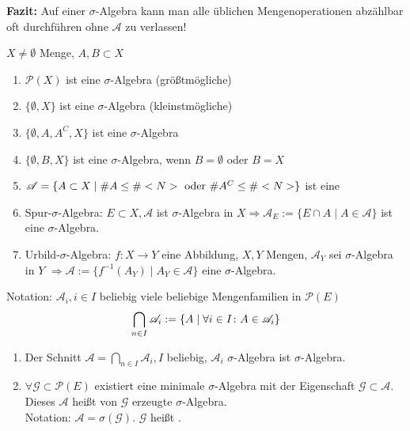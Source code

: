\textbf{Fazit:} Auf einer $\sigma$-Algebra kann man alle üblichen Mengenoperationen abzählbar oft durchführen ohne $\mathscr{A}$ zu verlassen!

\begin{example}
	$X\neq\emptyset$ Menge, $A,B\subset X$
	\begin{enumerate}[label=(\alph*)]
		\item $\mathscr{P}(X)$ ist eine $\sigma$-Algebra (größtmögliche)
		\item $\{\emptyset,X\}$ ist eine $\sigma$-Algebra (kleinstmögliche)
		\item $\{\emptyset,A,A^C,X\}$ ist eine $\sigma$-Algebra
		\item $\{\emptyset,B,X\}$ ist eine $\sigma$-Algebra, wenn $B=\emptyset$ oder $B=X$
		\item $\mathscr{A}=\{A\subset X\mid \#A\le \#<N>\text{ oder } \#A^C\le \#<N>\}$ ist eine \sigmalg %
		\item Spur-$\sigma$-Algebra: $E \subset X,\mathscr{A}$ ist $\sigma$-Algebra in $X \Rightarrow \mathscr{A}_E := \{E \cap A \mid A \in \mathscr{A}\}$ ist eine $\sigma$-Algebra.
		\item Urbild-$\sigma$-Algebra: $f: X \to Y$ eine Abbildung, $X,Y$ Mengen, $\mathscr{A}_Y$ sei $\sigma$-Algebra   in $Y$ $\Rightarrow \mathscr{A} := \{f^{-1}(A_Y)\mid A_Y \in \mathscr{A}\}$ eine $\sigma$-Algebra.
	\end{enumerate}
\end{example}

\begin{hint}
	Notation: $\mathscr{A}_i, i \in I$ beliebig viele beliebige Mengenfamilien in $\mathscr{P}(E)$
	\begin{align}
	\bigcap_{n\in I} \mathscr{A}_i := \{ A \mid \forall i \in I \colon A \in \mathscr{A}_i\}\notag
	\end{align}
\end{hint}

\begin{proposition}
	\begin{enumerate}[label=(\alph*)]
		\item Der Schnitt $\mathscr{A} = \bigcap_{n\in I} \mathscr{A}_i, I$ beliebig, $\mathscr{A}_i$ $\sigma$-Algebra ist $\sigma$-Algebra.
		\item $\forall \mathscr{G} \subset \mathscr{P}(E)$ existiert eine minimale $\sigma$-Algebra mit der Eigenschaft $\mathscr{G} \subset \mathscr{A}$. Dieses $\mathscr{A}$ heißt von $\mathscr{G}$ erzeugte $\sigma$-Algebra.\\
		Notation: $\mathscr{A} = \sigma(\mathscr{G})$.
		$\mathscr{G}$ heißt .
	\end{enumerate}
\end{proposition}

